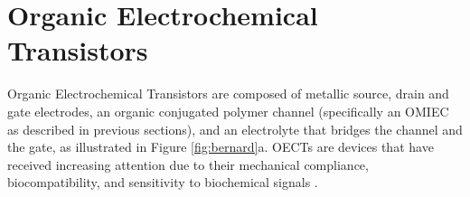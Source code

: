 

 


\section{Organic Electrochemical Transistors} \label{sec:OECTs}

Organic Electrochemical Transistors are composed of metallic source, drain and gate electrodes, an organic conjugated polymer channel (specifically an OMIEC as described in previous sections), and an electrolyte that bridges the channel and the gate, as illustrated in Figure \ref{fig:bernard}a. OECTs are devices that have received increasing attention due to their mechanical compliance, biocompatibility, and sensitivity to biochemical signals \cite{tanMixedIonicElectronic2022}. 

